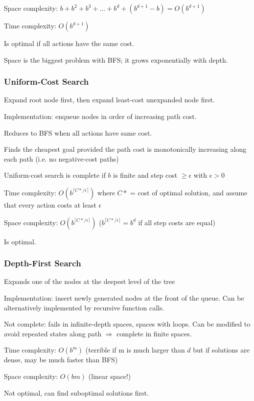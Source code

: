 Space complexity: $b + b^2 + b^3 + \ldots + b^d + (b^{d+1} - b) = O(b^{d+1})$

Time complexity: $O(b^{d+1})$

Is optimal if all actions have the same cost.

Space is the biggest problem with BFS; it grows exponentially with depth.

\subsubsection{Uniform-Cost Search}
Expand root node first, then expand least-cost unexpanded node first.

Implementation: enqueue nodes in order of increasing path cost.

Reduces to BFS when all actions have same cost.

Finds the cheapest goal provided the path cost is monotonically increasing
along each path (i.e. no negative-cost paths)

Uniform-cost search is complete if $b$ is finite and step cost $\geq \epsilon$
with $\epsilon > 0$

Time complexity: $O(b^{\lceil C*/\epsilon\rceil})$ where $C*$ = cost of optimal
solution, and assume that every action costs at least $\epsilon$

Space complexity: $O(b^{\lceil C*/\epsilon\rceil})$ ($b^{\lceil C*/\epsilon\rceil} = b^d$ if all step costs are equal)

Is optimal.

\subsubsection{Depth-First Search}
Expands one of the nodes at the deepest level of the tree

Implementation: insert newly generated nodes at the front of the queue.
Can be alternatively implemented by recursive function calls.

Not complete: fails in infinite-depth spaces, spaces with loops. Can be
modified to avoid repeated states along path $\Longrightarrow$ complete in finite
spaces.

Time complexity: $O(b^m)$ (terrible if m is much larger than $d$ but if
solutions are dense, may be much faster than BFS)

Space complexity: $O(bm)$ (linear space!)

Not optimal, can find suboptimal solutions first.

